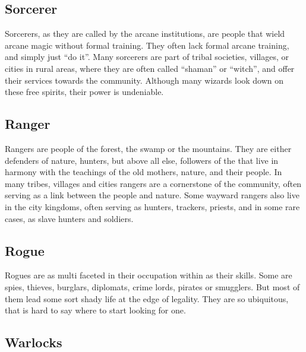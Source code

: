 \subsection{Sorcerer}
\label{sec:Sorcerer}

Sorcerers, as they are called by the arcane institutions, are people that wield
arcane magic without formal training. They often lack formal arcane training,
and simply just ``do it''. Many sorcerers are part of tribal societies,
villages, or cities in rural areas, where they are often called ``shaman'' or
``witch'', and offer their services towards the community. Although many wizards
look down on these free spirits, their power is undeniable.


\subsection{Ranger}
\label{sec:Ranger}

Rangers are people of the forest, the swamp or the mountains. They are either
defenders of nature, hunters, but above all else, followers of the
 that live in harmony with the teachings of the old
mothers, nature, and their people. In many tribes, villages and cities rangers
are a cornerstone of the community, often serving as a link between the people
and nature. Some wayward rangers also live in the city kingdoms, often serving
as hunters, trackers, priests, and in some rare cases, as slave hunters and
soldiers.


\subsection{Rogue}
\label{sec:Rogue}

Rogues are as multi faceted in their occupation within as their skills. Some
are spies, thieves, burglars, diplomats, crime lords, pirates or smugglers.
But most of them lead some sort shady life at the edge of legality. They are
so ubiquitous, that is hard to say where to start looking for one.


\subsection{Warlocks}
\label{sec:Warlocks}

